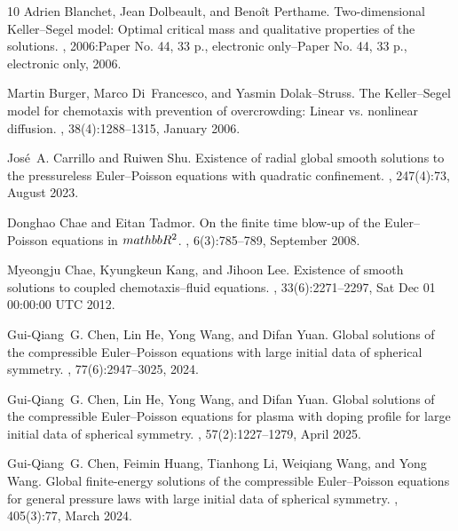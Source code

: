\documentclass[11pt]{article}
\theoremstyle{plain}
\theoremstyle{definition}
\theoremstyle{remark}
\numberwithin{equation}{section}
\begin{document}
\begin{thebibliography}{10}
Adrien Blanchet, Jean Dolbeault, and Beno\^{i}t Perthame.
\newblock Two-dimensional Keller--Segel model: Optimal critical mass and qualitative properties of the solutions.
, 2006:Paper No. 44, 33 p., electronic only--Paper No. 44, 33 p., electronic only, 2006.

Martin Burger, Marco Di~Francesco, and Yasmin Dolak--Struss.
\newblock The Keller--Segel model for chemotaxis with prevention of overcrowding: Linear vs. nonlinear diffusion.
, 38(4):1288--1315, January 2006.

José~A. Carrillo and Ruiwen Shu.
\newblock Existence of radial global smooth solutions to the pressureless Euler--Poisson equations with quadratic confinement.
, 247(4):73, August 2023.

Donghao Chae and Eitan Tadmor.
\newblock On the finite time blow-up of the Euler--Poisson equations in $\\mathbb R^{2}$.
, 6(3):785--789, September 2008.

Myeongju Chae, Kyungkeun Kang, and Jihoon Lee.
\newblock Existence of smooth solutions to coupled chemotaxis--fluid equations.
, 33(6):2271--2297, Sat Dec 01 00:00:00 UTC 2012.

Gui-Qiang~G. Chen, Lin He, Yong Wang, and Difan Yuan.
\newblock Global solutions of the compressible Euler--Poisson equations with large initial data of spherical symmetry.
, 77(6):2947--3025, 2024.

Gui-Qiang~G. Chen, Lin He, Yong Wang, and Difan Yuan.
\newblock Global solutions of the compressible Euler--Poisson equations for plasma with doping profile for large initial data of spherical symmetry.
, 57(2):1227--1279, April 2025.

Gui-Qiang~G. Chen, Feimin Huang, Tianhong Li, Weiqiang Wang, and Yong Wang.
\newblock Global finite-energy solutions of the compressible Euler--Poisson equations for general pressure laws with large initial data of spherical symmetry.
, 405(3):77, March 2024.


\end{thebibliography}
\end{document}
